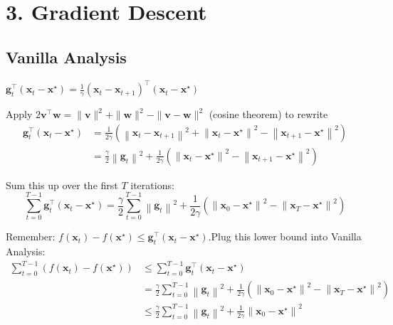 \section*{3. Gradient Descent}
\subsection*{Vanilla Analysis}
$\mathbf{g}_{t}^{\top}\left(\mathbf{x}_{t}-\mathbf{x}^{\star}\right)=\frac{1}{\gamma}\left(\mathbf{x}_{t}-\mathbf{x}_{t+1}\right)^{\top}\left(\mathbf{x}_{t}-\mathbf{x}^{\star}\right)$

Apply $2 \mathbf{v}^{\top} \mathbf{w}=\|\mathbf{v}\|^{2}+\|\mathbf{w}\|^{2}-\|\mathbf{v}-\mathbf{w}\|^{2}$ (cosine theorem) to rewrite
$$
\begin{aligned}
\mathbf{g}_{t}^{\top}\left(\mathbf{x}_{t}-\mathbf{x}^{\star}\right) &=\frac{1}{2 \gamma}\left(\left\|\mathbf{x}_{t}-\mathbf{x}_{t+1}\right\|^{2}+\left\|\mathbf{x}_{t}-\mathbf{x}^{\star}\right\|^{2}-\left\|\mathbf{x}_{t+1}-\mathbf{x}^{\star}\right\|^{2}\right) \\
&=\frac{\gamma}{2}\left\|\mathbf{g}_{t}\right\|^{2}+\frac{1}{2 \gamma}\left(\left\|\mathbf{x}_{t}-\mathbf{x}^{\star}\right\|^{2}-\left\|\mathbf{x}_{t+1}-\mathbf{x}^{\star}\right\|^{2}\right)
\end{aligned}
$$

Sum this up over the first $T$ iterations:
$$
\sum_{t=0}^{T-1} \mathbf{g}_{t}^{\top}\left(\mathbf{x}_{t}-\mathbf{x}^{\star}\right)=\frac{\gamma}{2} \sum_{t=0}^{T-1}\left\|\mathbf{g}_{t}\right\|^{2}+\frac{1}{2 \gamma}\left(\left\|\mathbf{x}_{0}-\mathbf{x}^{\star}\right\|^{2}-\left\|\mathbf{x}_{T}-\mathbf{x}^{\star}\right\|^{2}\right)
$$

Remember:
$
f\left(\mathbf{x}_{t}\right)-f\left(\mathbf{x}^{\star}\right) \leq \mathbf{g}_{t}^{\top}\left(\mathbf{x}_{t}-\mathbf{x}^{\star}\right)
$.Plug this lower bound into Vanilla Analysis:
$$
\begin{aligned}
\sum_{t=0}^{T-1}\left(f\left(\mathbf{x}_{t}\right)-f\left(\mathbf{x}^{\star}\right)\right) & \leq \sum_{t=0}^{T-1} \mathbf{g}_{t}^{\top}\left(\mathbf{x}_{t}-\mathbf{x}^{\star}\right) \\
&=\frac{\gamma}{2} \sum_{t=0}^{T-1}\left\|\mathbf{g}_{t}\right\|^{2}+\frac{1}{2 \gamma}\left(\left\|\mathbf{x}_{0}-\mathbf{x}^{\star}\right\|^{2}-\left\|\mathbf{x}_{T}-\mathbf{x}^{\star}\right\|^{2}\right) \\
& \leq \frac{\gamma}{2} \sum_{t=0}^{T-1}\left\|\mathbf{g}_{t}\right\|^{2}+\frac{1}{2 \gamma}\left\|\mathbf{x}_{0}-\mathbf{x}^{\star}\right\|^{2}
\end{aligned}
$$

